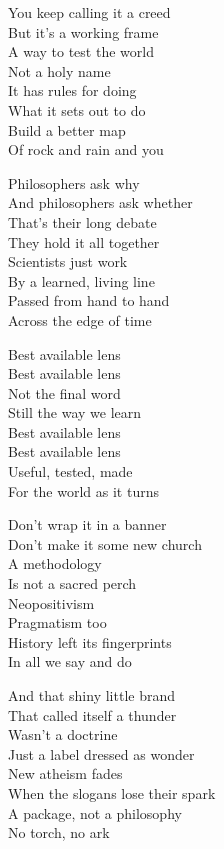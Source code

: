 \begin{lyrics}
You keep calling it a creed\\
But it’s a working frame\\
A way to test the world\\
Not a holy name\\
It has rules for doing\\
What it sets out to do\\
Build a better map\\
Of rock and rain and you

Philosophers ask why\\
And philosophers ask whether\\
That’s their long debate\\
They hold it all together\\
Scientists just work\\
By a learned, living line\\
Passed from hand to hand\\
Across the edge of time

Best available lens\\
Best available lens\\
Not the final word\\
Still the way we learn\\
Best available lens\\
Best available lens\\
Useful, tested, made\\
For the world as it turns

Don’t wrap it in a banner\\
Don’t make it some new church\\
A methodology\\
Is not a sacred perch\\
Neopositivism\\
Pragmatism too\\
History left its fingerprints\\
In all we say and do

And that shiny little brand\\
That called itself a thunder\\
Wasn’t a doctrine\\
Just a label dressed as wonder\\
New atheism fades\\
When the slogans lose their spark\\
A package, not a philosophy\\
No torch, no ark


\end{lyrics}
